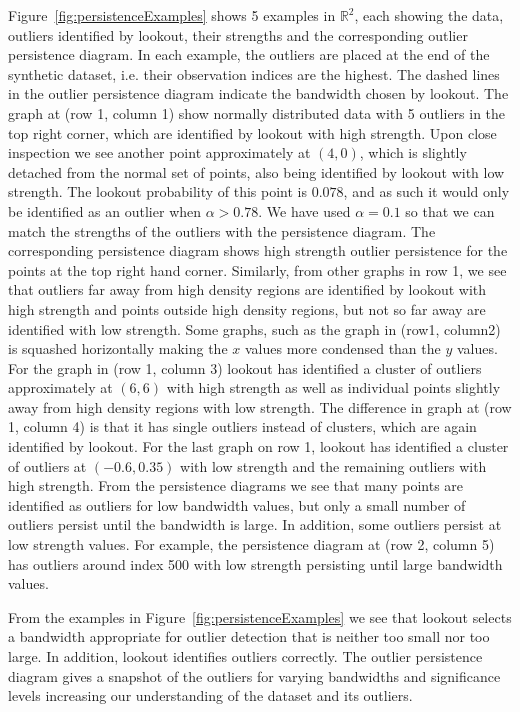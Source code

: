 \documentclass[letter,12pt]{article}
\begin{document}
Figure~\ref{fig:persistenceExamples} shows 5 examples in $\mathbb{R}^2$, each showing the data, outliers identified by lookout, their strengths and the corresponding outlier persistence diagram. In each example, the outliers are placed at the end of the synthetic dataset, i.e. their observation indices are the highest. The dashed lines in the outlier persistence diagram indicate the bandwidth chosen by lookout. The graph at (row 1, column 1) show normally distributed data with 5 outliers in the top right corner, which are identified by lookout with high strength. Upon close inspection we see another point approximately at $(4,0)$, which is slightly detached from the normal set of points, also being identified by  lookout with low strength. The lookout probability of this point is $0.078$, and as such it would only be identified as an outlier when $\alpha > 0.78$.  We have used $\alpha = 0.1$ so that we can match the strengths of the outliers with the persistence diagram. The corresponding persistence diagram shows high strength outlier persistence for the points at the top right hand corner. Similarly, from other graphs in row 1, we see that outliers far away from high density regions are identified by lookout with high strength and points outside high density regions, but not so far away are identified with low strength. Some graphs, such as the graph in (row1, column2) is squashed horizontally making the $x$ values more condensed than the $y$ values. For the graph in (row 1, column 3) lookout has identified a cluster of outliers approximately at $(6,6)$ with high strength as well as individual points slightly away from high density regions with low strength. The difference in graph at (row 1, column 4) is that it has single outliers instead of clusters, which are again identified by lookout. For the last graph on row 1, lookout has identified a cluster of outliers at $(-0.6, 0.35)$ with low strength and the remaining outliers with high strength. From the persistence diagrams we see that many points are identified as outliers for low bandwidth values, but only a small number of outliers persist until the bandwidth is large. In addition, some outliers persist at low strength values. For example, the persistence diagram at (row 2, column 5) has outliers around index 500 with low strength persisting until large bandwidth values.

From the examples in Figure~\ref{fig:persistenceExamples} we see that lookout selects a bandwidth appropriate for outlier detection that is neither too small nor too large. In addition, lookout identifies outliers correctly. The outlier persistence diagram  gives a snapshot of the outliers for varying bandwidths and significance levels increasing our understanding of the dataset and its outliers.  
\end{document}
